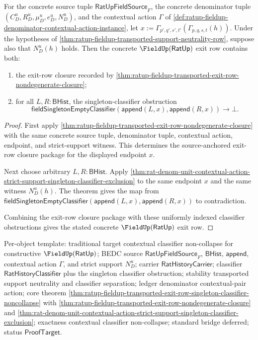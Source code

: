\begin{theorem}
\label{thm:ratup-fieldup-transported-exit-row-singleton-classifier-noncollapse}
For the concrete source tuple $\mathsf{RatUpFieldSource}_F$, the concrete
denominator tuple $(C_D^u,R_D^u,\mu_D^u,e_D^u,N_D^u)$, and the contextual
action $\Gamma$ of
\autoref{def:ratup-fieldup-denominator-contextual-action-instance}, let
$x:=\Gamma_{p',q',s',t'}(\Gamma_{p,q,s,t}(h))$. Under the hypotheses of
\autoref{thm:ratup-fieldup-transported-support-neutrality-row}, suppose also
that $N_D^u(h)$ holds. Then the concrete $\FieldUp(\mathsf{RatUp})$ exit row
contains both:
\begin{enumerate}
  \item the exit-row closure recorded by
  \autoref{thm:ratup-fieldup-transported-exit-row-nondegenerate-closure};
  \item for all $L,R:\mathsf{BHist}$, the singleton-classifier obstruction
  $$
  \mathsf{fieldSingletonEmptyClassifier}(\mathsf{append}(L,x),\mathsf{append}(R,x))
  \to\bot.
  $$
\end{enumerate}
\end{theorem}
\begin{proof}
First apply
\autoref{thm:ratup-fieldup-transported-exit-row-nondegenerate-closure} with the
same concrete source tuple, denominator tuple, contextual action, endpoint, and
strict-support witness. This determines the source-anchored exit-row closure
package for the displayed endpoint $x$.

Next choose arbitrary $L,R:\mathsf{BHist}$. Apply
\autoref{thm:rat-denom-unit-contextual-action-strict-support-singleton-classifier-exclusion}
to the same endpoint $x$ and the same witness $N_D^u(h)$. The theorem gives the
map from
$\mathsf{fieldSingletonEmptyClassifier}(\mathsf{append}(L,x),\mathsf{append}(R,x))$
to contradiction.

Combining the exit-row closure package with these uniformly indexed classifier
obstructions gives the stated concrete $\FieldUp(\mathsf{RatUp})$ exit row.
\end{proof}

Per-object template: traditional target contextual classifier non-collapse for
constructive $\FieldUp(\mathsf{RatUp})$; BEDC source
$\mathsf{RatUpFieldSource}_F$, $\mathsf{BHist}$, $\mathsf{append}$, contextual
action $\Gamma$, and strict support $N_D^u$; carrier
$\mathsf{RatHistoryCarrier}$; classifier $\mathsf{RatHistoryClassifier}$ plus
the singleton classifier obstruction; stability transported support neutrality
and classifier separation; ledger denominator contextual-pair action; core
theorem
\autoref{thm:ratup-fieldup-transported-exit-row-singleton-classifier-noncollapse}
with
\autoref{thm:ratup-fieldup-transported-exit-row-nondegenerate-closure} and
\autoref{thm:rat-denom-unit-contextual-action-strict-support-singleton-classifier-exclusion};
exactness contextual classifier non-collapse; standard bridge deferred; status
$\mathsf{ProofTarget}$.

